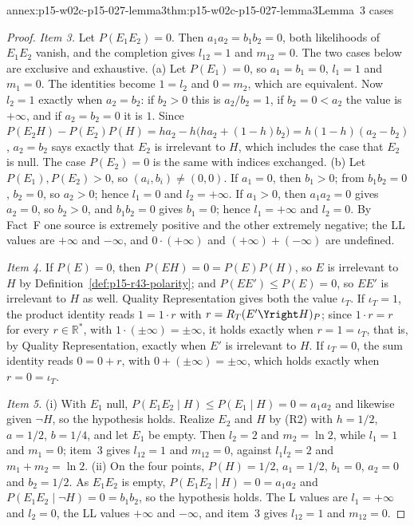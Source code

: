 \begin{annexitem}{annex:p15-w02c-p15-027-lemma3}{thm:p15-w02c-p15-027-lemma3}{Lemma~3 cases}
\begin{proof}
\emph{Item 3.} Let \(P(E_1E_2)=0\). Then \(a_1a_2=b_1b_2=0\), both
likelihoods of \(E_1E_2\) vanish, and the completion gives \(l_{12}=1\)
and \(m_{12}=0\). The two cases below are exclusive and exhaustive.
(a) Let \(P(E_1)=0\), so \(a_1=b_1=0\), \(l_1=1\) and \(m_1=0\). The
identities become \(1=l_2\) and \(0=m_2\), which are equivalent. Now
\(l_2=1\) exactly when \(a_2=b_2\): if \(b_2>0\) this is \(a_2/b_2=1\),
if \(b_2=0<a_2\) the value is \(+\infty\), and if \(a_2=b_2=0\) it is
\(1\). Since
\(P(E_2H)-P(E_2)P(H)=ha_2-h\bigl(ha_2+(1-h)b_2\bigr)=h(1-h)(a_2-b_2)\),
\(a_2=b_2\) says exactly that \(E_2\) is irrelevant to \(H\), which
includes the case that \(E_2\) is null. The case \(P(E_2)=0\) is the same
with indices exchanged.
(b) Let \(P(E_1),P(E_2)>0\), so \((a_i,b_i)\neq(0,0)\). If \(a_1=0\),
then \(b_1>0\); from \(b_1b_2=0\), \(b_2=0\), so \(a_2>0\); hence
\(l_1=0\) and \(l_2=+\infty\). If \(a_1>0\), then \(a_1a_2=0\) gives
\(a_2=0\), so \(b_2>0\), and \(b_1b_2=0\) gives \(b_1=0\); hence
\(l_1=+\infty\) and \(l_2=0\). By Fact~F one source is extremely
positive and the other extremely negative; the LL values are
\(+\infty\) and \(-\infty\), and \(0\cdot(+\infty)\) and
\((+\infty)+(-\infty)\) are undefined.

\emph{Item 4.} If \(P(E)=0\), then \(P(EH)=0=P(E)P(H)\), so \(E\) is
irrelevant to \(H\) by Definition~\ref{def:p15-r43-polarity}; and
\(P(EE')\leq P(E)=0\), so \(EE'\) is irrelevant to \(H\) as well. Quality
Representation gives both the value \(\iota_T\). If \(\iota_T=1\), the
product identity reads \(1=1\cdot r\) with \(r=R_T(E'\Yright H)_P\); since
\(1\cdot r=r\) for every \(r\in\mathbb R^*\), with
\(1\cdot(\pm\infty)=\pm\infty\), it holds exactly when \(r=1=\iota_T\), that is, by Quality Representation,
exactly when \(E'\) is irrelevant to \(H\). If \(\iota_T=0\), the sum
identity reads \(0=0+r\), with \(0+(\pm\infty)=\pm\infty\), which holds
exactly when \(r=0=\iota_T\).

\emph{Item 5.} (i) With \(E_1\) null, \(P(E_1E_2\mid H)\leq P(E_1\mid H)=0
=a_1a_2\) and likewise given \(\neg H\), so the hypothesis holds. Realize
\(E_2\) and \(H\) by (R2) with \(h=1/2\), \(a=1/2\), \(b=1/4\), and let
\(E_1\) be empty. Then \(l_2=2\) and \(m_2=\ln2\), while \(l_1=1\) and
\(m_1=0\); item~3 gives \(l_{12}=1\) and \(m_{12}=0\), against
\(l_1l_2=2\) and \(m_1+m_2=\ln2\). (ii) On the four points,
\(P(H)=1/2\), \(a_1=1/2\), \(b_1=0\), \(a_2=0\) and \(b_2=1/2\). As
\(E_1E_2\) is empty, \(P(E_1E_2\mid H)=0=a_1a_2\) and
\(P(E_1E_2\mid\neg H)=0=b_1b_2\), so the hypothesis holds. The L values
are \(l_1=+\infty\) and \(l_2=0\), the LL values \(+\infty\) and
\(-\infty\), and item~3 gives \(l_{12}=1\) and \(m_{12}=0\).
\end{proof}
\end{annexitem}

